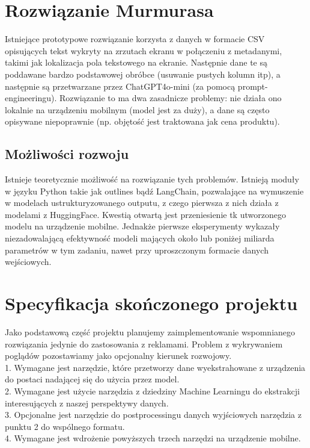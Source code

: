 \documentclass[12pt]{article}
\begin{document}
\section*{Rozwiązanie Murmurasa}
Istniejące prototypowe rozwiązanie korzysta z danych w formacie CSV opisujących tekst wykryty na zrzutach ekranu w połączeniu z metadanymi, takimi jak lokalizacja pola tekstowego na ekranie.  Następnie dane te są poddawane bardzo podstawowej obróbce (usuwanie pustych kolumn itp), a następnie są przetwarzane przez ChatGPT4o-mini (za pomocą prompt-engineeringu). Rozwiązanie to ma dwa zasadnicze problemy: nie działa ono lokalnie na urządzeniu mobilnym (model jest za duży), a dane są często opisywane niepoprawnie (np. objętość jest traktowana jak cena produktu).

\subsection*{Możliwości rozwoju}
Istnieje teoretycznie możliwość na rozwiązanie tych problemów. Istnieją moduły w języku Python takie jak outlines\cite{willard2023efficient} bądź LangChain\cite{Chase_LangChain_2022}, pozwalające na wymuszenie w modelach ustrukturyzowanego outputu, z czego pierwsza z nich działa z modelami z HuggingFace. Kwestią otwartą jest przeniesienie tk utworzonego modelu na urządzenie mobilne. Jednakże pierwsze eksperymenty wykazały niezadowalającą efektywność modeli mających około lub poniżej miliarda parametrów w tym zadaniu, nawet przy uproszczonym formacie danych wejściowych.

\section*{Specyfikacja skończonego projektu}
Jako podstawową część projektu planujemy zaimplementowanie wspomnianego rozwiązania jedynie do zastosowania z reklamami. Problem z wykrywaniem poglądów pozostawiamy jako opcjonalny kierunek rozwojowy.\\
1. Wymagane jest narzędzie, które przetworzy dane wyekstrahowane z urządzenia do postaci nadającej się do użycia przez model. \\
2. Wymagane jest użycie narzędzia z dziedziny Machine Learningu do ekstrakcji interesujących z naszej perspektywy danych. \\
3. Opcjonalne jest narzędzie do postprocessingu danych wyjściowych narzędzia z punktu 2 do wspólnego formatu. \\
4. Wymagane jest wdrożenie powyższych trzech narzędzi na urządzenie mobilne.
\end{document}
